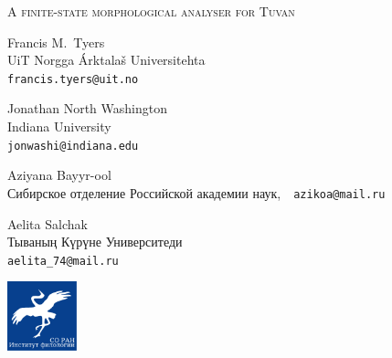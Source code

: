 \documentclass[fontscale=0.35,landscape,paperwidth=841mm,paperheight=1189mm]{baposter}  %
\begin{document}
\begin{poster}
{	}{ %
		{%
			{\titlefont \scshape{A finite-state morphological analyser for Tuvan}
			}
		}
	}{ %
		\begin{center}
			\begin{minipage}[t]{8.5em} %
				\begin{spacing}{0.4}
				{Francis M.\ Tyers}\\
				{\footnotesize UiT Norgga Árktalaš Universitehta \\\texttt{francis.tyers@uit.no}}
				\end{spacing}
			\end{minipage}
			\begin{minipage}[t]{12em}
				\begin{spacing}{0.4}
					{Jonathan North Washington}\\
					{\footnotesize Indiana University\\\texttt{jonwashi@indiana.edu}}
				\end{spacing}
			\end{minipage}
			\begin{minipage}[t]{9em} %
				\begin{spacing}{0.4}
					{Aziyana Bayyr-ool}\\
					{\footnotesize Сибирское отделение Российской академии наук,~~\texttt{azikoa@mail.ru}}
				\end{spacing}
			\end{minipage}
			\begin{minipage}[t]{8em} %
				\begin{spacing}{0.4}
					{Aelita Salchak\vphantom{y}}\\
					{\footnotesize Тываның Күрүне Университеди\\\texttt{aelita\_74@mail.ru}}
				\end{spacing}
			\end{minipage}
		\end{center}
	}{ %
		\setlength\fboxsep{0.5em}
		\setlength\fboxrule{0pt}
		\includegraphics[height=5.4em]{img/soranif}
	}


\end{poster}
\end{document}
